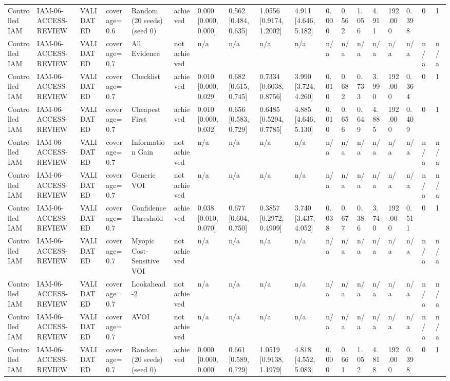 \begin{table}[!ht]
{\begin{tabular}{llllllllllllllllll}
Controlled IAM & IAM-06-ACCESS-REVIEW & VALIDATED & coverage=0.6 & Random (20 seeds) (seed 0) & achieved & 0.000 [0.000, 0.000] & 0.562 [0.484, 0.635] & 1.0556 [0.9174, 1.2002] & 4.911 [4.646, 5.182] & 0.000 & 0.562 & 1.056 & 4.911 & 192.000 & 0.398 & 0 & 1 \\
Controlled IAM & IAM-06-ACCESS-REVIEW & VALIDATED & coverage=0.7 & All Evidence & not achieved & n/a & n/a & n/a & n/a & n/a & n/a & n/a & n/a & n/a & n/a & n/a & n/a \\
Controlled IAM & IAM-06-ACCESS-REVIEW & VALIDATED & coverage=0.7 & Checklist & achieved & 0.010 [0.000, 0.029] & 0.682 [0.615, 0.745] & 0.7334 [0.6038, 0.8756] & 3.990 [3.724, 4.260] & 0.010 & 0.682 & 0.733 & 3.990 & 192.000 & 0.364 & 0 & 1 \\
Controlled IAM & IAM-06-ACCESS-REVIEW & VALIDATED & coverage=0.7 & Cheapest First & achieved & 0.010 [0.000, 0.032] & 0.656 [0.583, 0.729] & 0.6485 [0.5294, 0.7785] & 4.885 [4.646, 5.130] & 0.010 & 0.656 & 0.649 & 4.885 & 192.000 & 0.409 & 0 & 1 \\
Controlled IAM & IAM-06-ACCESS-REVIEW & VALIDATED & coverage=0.7 & Information Gain & not achieved & n/a & n/a & n/a & n/a & n/a & n/a & n/a & n/a & n/a & n/a & n/a & n/a \\
Controlled IAM & IAM-06-ACCESS-REVIEW & VALIDATED & coverage=0.7 & Generic VOI & not achieved & n/a & n/a & n/a & n/a & n/a & n/a & n/a & n/a & n/a & n/a & n/a & n/a \\
Controlled IAM & IAM-06-ACCESS-REVIEW & VALIDATED & coverage=0.7 & Confidence Threshold & achieved & 0.038 [0.010, 0.070] & 0.677 [0.604, 0.750] & 0.3857 [0.2972, 0.4909] & 3.740 [3.437, 4.052] & 0.038 & 0.677 & 0.386 & 3.740 & 192.000 & 0.511 & 0 & 1 \\
Controlled IAM & IAM-06-ACCESS-REVIEW & VALIDATED & coverage=0.7 & Myopic Cost-Sensitive VOI & not achieved & n/a & n/a & n/a & n/a & n/a & n/a & n/a & n/a & n/a & n/a & n/a & n/a \\
Controlled IAM & IAM-06-ACCESS-REVIEW & VALIDATED & coverage=0.7 & Lookahead-2 & not achieved & n/a & n/a & n/a & n/a & n/a & n/a & n/a & n/a & n/a & n/a & n/a & n/a \\
Controlled IAM & IAM-06-ACCESS-REVIEW & VALIDATED & coverage=0.7 & AVOI & not achieved & n/a & n/a & n/a & n/a & n/a & n/a & n/a & n/a & n/a & n/a & n/a & n/a \\
Controlled IAM & IAM-06-ACCESS-REVIEW & VALIDATED & coverage=0.7 & Random (20 seeds) (seed 0) & achieved & 0.000 [0.000, 0.000] & 0.661 [0.589, 0.729] & 1.0519 [0.9138, 1.1979] & 4.818 [4.552, 5.083] & 0.000 & 0.661 & 1.052 & 4.818 & 192.000 & 0.398 & 0 & 1 \\

\end{tabular}}
\end{table}
